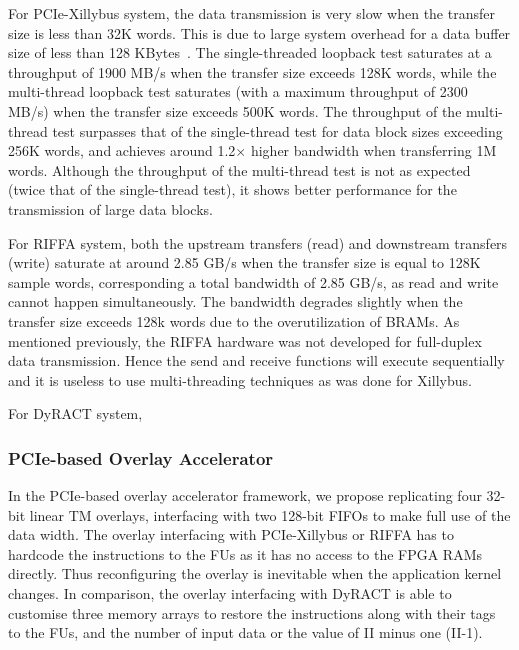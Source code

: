 For PCIe-Xillybus system, the data transmission is very slow when the transfer size is less than 32K words. 
This is due to large system overhead for a data buffer size of less than 128 KBytes~\cite{xillybus2018}. 
The single-threaded loopback test saturates at a throughput of 1900 MB/s when the transfer size exceeds 128K words, while the multi-thread loopback test saturates (with a maximum throughput of 2300 MB/s) when the transfer size exceeds 500K words. 
The throughput of the multi-thread test surpasses that of the single-thread test for data block sizes exceeding 256K words, and achieves around 1.2$\times$ higher bandwidth when transferring 1M words. 
Although the throughput of the multi-thread test is not as expected (twice that of the single-thread test), it shows better performance for the transmission of large data blocks. 


For RIFFA system, both the upstream transfers (read) and downstream transfers (write) saturate at around 2.85 GB/s when the transfer size is equal to 128K sample words, corresponding a total bandwidth of 2.85 GB/s, as read and write cannot happen simultaneously. 
The bandwidth degrades slightly when the transfer size exceeds 128k words due to the overutilization of BRAMs.
As mentioned previously, the RIFFA hardware was not developed for full-duplex data transmission. 
Hence the send and receive functions will execute sequentially and it is useless to use multi-threading techniques as was done for Xillybus. 


For DyRACT system,  


\subsubsection{PCIe-based Overlay Accelerator}
In the PCIe-based overlay accelerator framework, we propose replicating four 32-bit linear TM overlays, interfacing with two 128-bit FIFOs to make full use of the data width.
The overlay interfacing with PCIe-Xillybus or RIFFA has to hardcode the instructions to the FUs as it has no access to the FPGA RAMs directly. 
Thus reconfiguring the overlay is inevitable when the application kernel changes. 
In comparison, the overlay interfacing with DyRACT is able to customise three memory arrays to restore the instructions along with their tags to the FUs, and the number of input data or the value of II minus one (II-1). 


